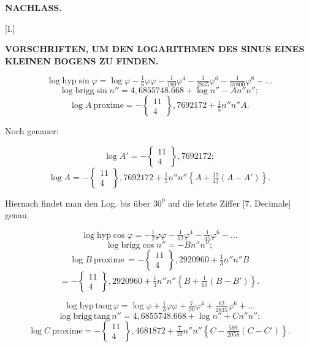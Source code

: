 
\clearpage{}




\begin{center}
\textbf{NACHLASS.}
\end{center}

\begin{center}
[I.]
\end{center}

\begin{center}
\textbf{VORSCHRIFTEN, UM DEN LOGARITHMEN DES SINUS EINES
KLEINEN BOGENS ZU FINDEN.}
\end{center}

\[
\log\mathrm{hyp}\sin\varphi = \log\varphi - \tfrac{1}{6}\varphi\varphi - \tfrac{1}{180}\varphi^4 - \tfrac{1}{2835}\varphi^6 - \tfrac{1}{37800}\varphi^8 - \ldots
\]
\[
\log\mathrm{brigg}\sin n'' = 4{,}6855748.668 + \log n'' - An''n'';
\]
\[
\log A\ \mathrm{proxime} = -\left\{\!\begin{smallmatrix}11\\4\end{smallmatrix}\!\right\}{,}7692172 + \tfrac{1}{5}n''n''A.
\]

Noch genauer:

\[
\log A' = -\left\{\!\begin{smallmatrix}11\\4\end{smallmatrix}\!\right\}{,}7692172;
\]
\[
\log A = -\left\{\!\begin{smallmatrix}11\\4\end{smallmatrix}\!\right\}{,}7692172 + \tfrac{1}{5}n''n''\left\{A+\tfrac{17}{42}(A-A')\right\}.
\]

Hiernach findet man den Log. bis über $30^0$ auf die letzte Ziffer [7. Decimale] genau.

\[
\log\mathrm{hyp}\cos\varphi = -\tfrac{1}{2}\varphi\varphi - \tfrac{1}{12}\varphi^4 - \tfrac{1}{45}\varphi^6 - \ldots
\]
\[
\log\mathrm{brigg}\cos n'' = -Bn''n'';
\]
\[
\log B\ \mathrm{proxime}\ = -\left\{\!\begin{smallmatrix}11\\4\end{smallmatrix}\!\right\}{,}2920960 + \tfrac{1}{3}n''n''B
\]
\[
= -\left\{\!\begin{smallmatrix}11\\4\end{smallmatrix}\!\right\}{,}2920960 + \tfrac{1}{3}n''n''\left\{B+\tfrac{1}{10}(B-B')\right\}.
\]

\[
\log\mathrm{hyp}\,\mathrm{tang}\,\varphi = \log\varphi + \tfrac{1}{3}\varphi\varphi + \tfrac{7}{90}\varphi^4 + \tfrac{62}{2835}\varphi^6 + \ldots
\]
\[
\log\mathrm{brigg}\,\mathrm{tang}\,n'' = 4{,}6855748.668 + \log n'' + Cn''n'';
\]
\[
\log C\ \mathrm{proxime} = -\left\{\!\begin{smallmatrix}11\\4\end{smallmatrix}\!\right\}{,}4681872 + \tfrac{7}{10}n''n''\left\{C-\tfrac{599}{2058}(C-C')\right\}. 
\]
